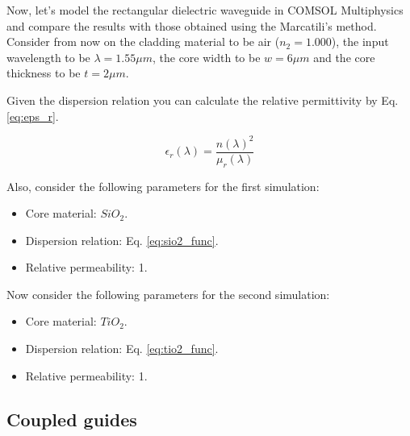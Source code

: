 \documentclass[a4paper,12pt]{article}
\begin{document}
Now, let's model the rectangular dielectric waveguide in COMSOL Multiphysics and compare the results with those obtained using the Marcatili's method. Consider from now on the cladding material to be air ($n_2 = 1.000$), the input wavelength to be $\lambda = 1.55 \mu m$, the core width to be $w = 6 \mu m$ and the core thickness to be $t = 2 \mu m$.

Given the dispersion relation you can calculate the relative permittivity by Eq. \eqref{eq:eps_r}.

\begin{equation}
    \epsilon_r(\lambda) = \frac{n(\lambda)^2}{\mu_r(\lambda)}
    \label{eq:eps_r}
\end{equation}

Also, consider the following parameters for the first simulation:
\begin{itemize}
    \item Core material: $SiO_2$.
    \item Dispersion relation: Eq. \eqref{eq:sio2_func}.
    \item Relative permeability: 1.
\end{itemize}

Now consider the following parameters for the second simulation:
\begin{itemize}
    \item Core material: $TiO_2$.
    \item Dispersion relation: Eq. \eqref{eq:tio2_func}.
    \item Relative permeability: 1.
\end{itemize}

\subsection{Coupled guides}
\label{subsec:coupled_guides}
\end{document}
